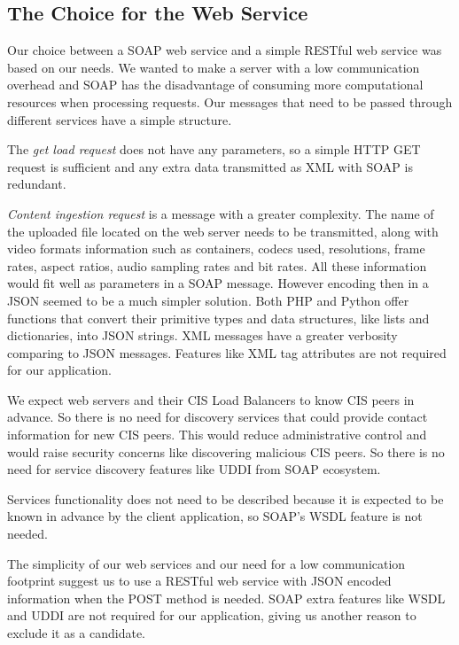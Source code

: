 \subsection{The Choice for the Web Service}
\label{subsec:securing-cis}

Our choice between a SOAP web service and a simple RESTful web service was based on our needs. We wanted to make a server with a low communication overhead and SOAP has the disadvantage of consuming more computational resources when processing requests. Our messages that need to be passed through different services have a simple structure. 

The \textit{get load request} does not have any parameters, so a simple HTTP GET request is sufficient and any extra data transmitted as XML with SOAP is redundant.

\textit{Content ingestion request} is a message with a greater complexity. The name of the uploaded file located on the web server needs to be transmitted, along with video formats information such as containers, codecs used, resolutions, frame rates, aspect ratios, audio sampling rates and bit rates. All these information would fit well as parameters in a SOAP message. However encoding then in a JSON seemed to be a much simpler solution. Both PHP and Python offer functions that convert their primitive types and data structures, like lists and dictionaries, into JSON strings. XML messages have a greater verbosity comparing to JSON messages. Features like XML tag attributes are not required for our application.

We expect web servers and their CIS Load Balancers to know CIS peers in advance. So there is no need for discovery services that could provide contact information for new CIS peers. This would reduce administrative control and would raise security concerns like discovering malicious CIS peers. So there is no need for service discovery features like UDDI from SOAP ecosystem.

Services functionality does not need to be described because it is expected to be known in advance by the client application, so SOAP's WSDL feature is not needed.

The simplicity of our web services and our need for a low communication footprint suggest us to use a RESTful web service with JSON encoded information when the POST method is needed. SOAP extra features like WSDL and UDDI are not required for our application, giving us another reason to exclude it as a candidate.

